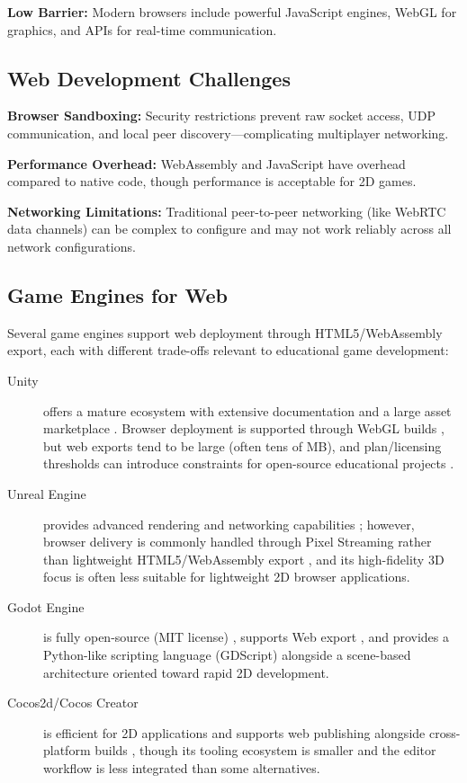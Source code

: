 \textbf{Low Barrier:} Modern browsers include powerful JavaScript engines, WebGL for graphics, and APIs for real-time communication.

\subsection{Web Development Challenges}
\label{subsec:web-challenges}

\textbf{Browser Sandboxing:} Security restrictions prevent raw socket access, UDP communication, and local peer discovery—complicating multiplayer networking.

\textbf{Performance Overhead:} WebAssembly and JavaScript have overhead compared to native code, though performance is acceptable for 2D games.

\textbf{Networking Limitations:} Traditional peer-to-peer networking (like WebRTC data channels) can be complex to configure and may not work reliably across all network configurations.

\subsection{Game Engines for Web}
\label{subsec:web-game-engines}

Several game engines support web deployment through HTML5/WebAssembly export, each with different trade-offs relevant to educational game development:
\begin{description}
    \item[Unity] offers a mature ecosystem with extensive documentation and a large asset marketplace \citep{unity_engine,unity_asset_store}. Browser deployment is supported through WebGL builds \citep{unity_webgl_docs}, but web exports tend to be large (often tens of MB), and plan/licensing thresholds can introduce constraints for open-source educational projects \citep{unity_pricing}.
    \item[Unreal Engine] provides advanced rendering and networking capabilities \citep{unreal_engine}; however, browser delivery is commonly handled through Pixel Streaming rather than lightweight HTML5/WebAssembly export \citep{unreal_pixel_streaming}, and its high-fidelity 3D focus is often less suitable for lightweight 2D browser applications.
    \item[Godot Engine] is fully open-source (MIT license) \citep{godot_engine,godot_license}, supports Web export \citep{godot_web_export}, and provides a Python-like scripting language (GDScript) alongside a scene-based architecture oriented toward rapid 2D development.
    \item[Cocos2d/Cocos Creator] is efficient for 2D applications and supports web publishing alongside cross-platform builds \citep{cocos_creator,cocos_web_build}, though its tooling ecosystem is smaller and the editor workflow is less integrated than some alternatives.
\end{description}

